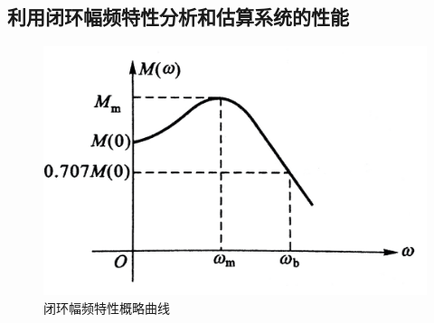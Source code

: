 \subsection{利用闭环幅频特性分析和估算系统的性能}
\vspace*{-1.5em}
\begin{figure}[!htb]
	\centering
	\includegraphics[width=0.4\linewidth]{pic/闭环幅频特性.jpeg}
	\vspace*{-2em}
	\caption{闭环幅频特性概略曲线}
	\vspace*{-1em}
	\label{闭环幅频特性}
\end{figure}
